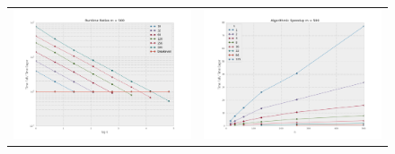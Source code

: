 \begin{figure}
\begin{tabular}{cc}
\includegraphics[width=\plotwidth]{tratio500.png} & \includegraphics[width=\plotwidth]{tratioarc500.png} \\

\end{tabular}
\end{figure}
